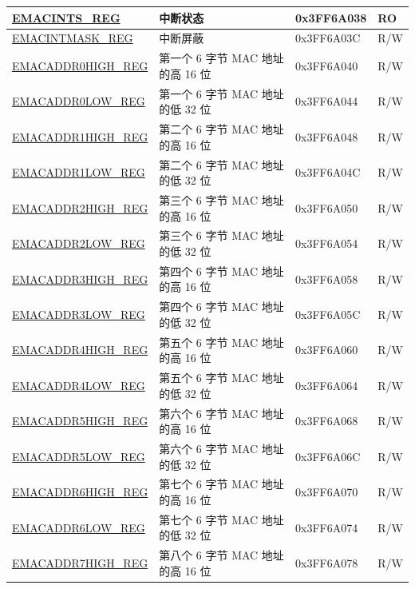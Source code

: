 \begin{longtable}{ |m{5cm} |m{6.3cm} | m{2cm} | m{2.2cm} | }
\hyperref[regdesc:EMACINTSREG]{EMACINTS\_REG} & 中断状态 & 0x3FF6A038 & RO \\ \hline
\hyperref[regdesc:EMACINTMASKREG]{EMACINTMASK\_REG} & 中断屏蔽& 0x3FF6A03C & R/W \\ \hline
\hyperref[regdesc:EMACADDR0HIGHREG]{EMACADDR0HIGH\_REG} & 第一个 6 字节 MAC 地址的高 16 位& 0x3FF6A040 & R/W \\ \hline
\hyperref[regdesc:EMACADDR0LOWREG]{EMACADDR0LOW\_REG} & 第一个 6 字节 MAC 地址的低 32 位& 0x3FF6A044 & R/W \\ \hline
\hyperref[regdesc:EMACADDR1HIGHREG]{EMACADDR1HIGH\_REG} & 第二个 6 字节 MAC 地址的高 16 位& 0x3FF6A048 & R/W \\ \hline
\hyperref[regdesc:EMACADDR1LOWREG]{EMACADDR1LOW\_REG} & 第二个 6 字节 MAC 地址的低 32 位& 0x3FF6A04C & R/W \\ \hline
\hyperref[regdesc:EMACADDR2HIGHREG]{EMACADDR2HIGH\_REG} & 第三个 6 字节 MAC 地址的高 16 位& 0x3FF6A050 & R/W \\ \hline
\hyperref[regdesc:EMACADDR2LOWREG]{EMACADDR2LOW\_REG} & 第三个 6 字节 MAC 地址的低 32 位& 0x3FF6A054 & R/W \\ \hline
\hyperref[regdesc:EMACADDR3HIGHREG]{EMACADDR3HIGH\_REG} &  第四个 6 字节 MAC 地址的高 16 位 & 0x3FF6A058 & R/W \\ \hline
\hyperref[regdesc:EMACADDR3LOWREG]{EMACADDR3LOW\_REG} & 第四个 6 字节 MAC 地址的低 32 位 & 0x3FF6A05C & R/W \\ \hline
\hyperref[regdesc:EMACADDR4HIGHREG]{EMACADDR4HIGH\_REG} &  第五个 6 字节 MAC 地址的高 16 位 & 0x3FF6A060 & R/W \\ \hline
\hyperref[regdesc:EMACADDR4LOWREG]{EMACADDR4LOW\_REG} & 第五个 6 字节 MAC 地址的低 32 位 & 0x3FF6A064 & R/W \\ \hline
\hyperref[regdesc:EMACADDR5HIGHREG]{EMACADDR5HIGH\_REG} &  第六个 6 字节 MAC 地址的高 16 位 & 0x3FF6A068 & R/W \\ \hline
\hyperref[regdesc:EMACADDR5LOWREG]{EMACADDR5LOW\_REG} & 第六个 6 字节 MAC 地址的低 32 位 & 0x3FF6A06C & R/W \\ \hline
\hyperref[regdesc:EMACADDR6HIGHREG]{EMACADDR6HIGH\_REG} &  第七个 6 字节 MAC 地址的高 16 位 & 0x3FF6A070 & R/W \\ \hline
\hyperref[regdesc:EMACADDR6LOWREG]{EMACADDR6LOW\_REG} & 第七个 6 字节 MAC 地址的低 32 位 & 0x3FF6A074 & R/W \\ \hline
\hyperref[regdesc:EMACADDR7HIGHREG]{EMACADDR7HIGH\_REG} &  第八个 6 字节 MAC 地址的高 16 位 & 0x3FF6A078 & R/W \\ \hline

\end{longtable}
